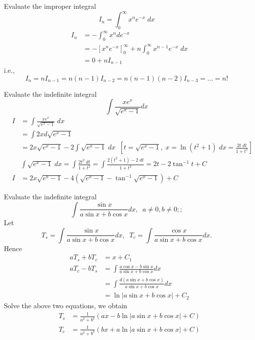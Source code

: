 \documentclass{article}
\begin{document}
\vspace{0.2in}


\newpage


 Evaluate the improper integral
$$
I_n = \int_0^{\infty} x^n  e^{-x} \;  dx
$$
\begin{eqnarray}
& I_n & = -\int_0^{\infty} x^n  d e^{-x}    \nonumber\\
&   & = - \left[ x^n  e^{-x} \right]_0^{\infty} + n \int_0^{\infty} x^{n-1}   e^{-x} \; dx  \nonumber\\
&   & = 0+ n I_{n-1}   \nonumber
\end{eqnarray}
i.e.,
$$
I_n=n I_{n-1}=n (n-1) I_{n-2}=n (n-1)(n-2) I_{n-3}=...=n!
$$

\vspace{0.2in}


 Evaluate the indefinite integral
$$
\int \frac{x e^x}{\sqrt{e^x-1} } dx
$$
\begin{eqnarray}
& I & =\int \frac{x e^x}{\sqrt{e^x-1} } \;  dx  \nonumber\\
&   & =\int 2x d \sqrt{e^x-1}   \nonumber\\
&   & = 2 x \sqrt{e^x-1}-2 \int \sqrt{e^x-1} \; dx \;\; \left[
t=\sqrt{e^x-1},\; x=\ln(t^2+1)\;
dx = \frac{2t \; dt}{1+t^2}\right]  \nonumber\\
& &  \int  \sqrt{e^x-1} \; dx =\int \frac{2t^2 \; dt}{1+t^2}= \int
\frac{2(t^2+1)-2 \; dt}{1+t^2}=2t-2\tan^{-1}t+C
\nonumber\\
& I  & = 2 x \sqrt{e^x-1}-4 \left( \sqrt{e^x-1} -
\tan^{-1}\sqrt{e^x-1} \right) +C \nonumber
\end{eqnarray}


\vspace{0.2in}






\bigskip

Evaluate the indefinite integral
$$
\int   \frac{ \sin x}{a \sin x+ b\cos x  } dx, \;\; a \ne 0, b \ne
0; ;
$$
Let
$$
T_s =\int   \frac{ \sin x}{a \sin x+ b\cos x  } dx, \;\; T_c =
\int \frac{ \cos x}{a \sin x+ b\cos x  } dx.
$$
Hence
\begin{eqnarray}
& aT_s+ bT_c & = x +C_1    \nonumber\\
& aT_c - b T_s  & = \int   \frac{ a \cos x - b \sin x}{a \sin x+ b\cos x  } dx      \nonumber\\
&  &            = \int   \frac{ d( a \sin x + b \cos x)}{a \sin x+ b\cos x  } dx      \nonumber\\
&  &            = \ln  | a \sin x + b \cos x | +C_2
\end{eqnarray}
Solve the above two equations, we obtain
\begin{eqnarray}
& T_s  & =   \frac{1}{a^2 +b^2} \left( a x -b \ln  | a \sin x + b \cos x | +C \right)      \nonumber\\
& T_c  & =    \frac{1}{a^2 +b^2} \left( b x +a \ln  | a \sin x + b
\cos x | +C \right)      \nonumber
\end{eqnarray}
\end{document}
